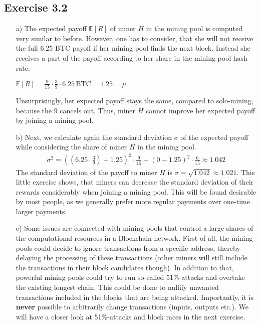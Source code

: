 \documentclass[12pt]{article}
\begin{document}
	\subsection*{Exercise 3.2}
	\begin{itemize}
		\item[a)] The expected payoff $\mathbb{E}[R]$ of miner $H$ in the mining pool is computed very similar to before. However, one has to consider, that she will not receive the full 6.25 BTC payoff if her mining pool finds the next block. Instead she receives a part of the payoff according to her share in the mining pool hash rate.
		\begin{center}
			$\mathbb{E}[R] = \frac{9}{15} \cdot \frac{3}{9} \cdot 6.25 \, \text{BTC} = 1.25 = \mu$
		\end{center}
		Unsurprisingly, her expected payoff stays the same, compared to solo-mining, because the $9$ cancels out. Thus, miner $H$ cannot improve her expected payoff by joining a mining pool. 
		\item[b)] Next, we calculate again the standard deviation $\sigma$ of the expected payoff while considering the share of miner $H$ in the mining pool.
		\begin{align*}
			\sigma^{2} = ((6.25 \cdot \frac{3}{9})-1.25)^{2} \cdot \frac{9}{15} + (0-1.25)^{2} \cdot \frac{6}{15} \approx  1.042
		\end{align*}
		The standard deviation of the payoff to miner $H$ is $\sigma = \sqrt{1.042} \approx 1.021$. This little exercise shows, that miners can decrease the standard deviation of their rewards considerably when joining a mining pool. This will be found desirable by most people, as we generally prefer more regular payments over one-time larger payments.
		\item[c)] Some issues are connected with mining pools that control a large shares of the computational resources in a Blockchain network. First of all, the mining pools could decide to ignore transactions from a specific address, thereby delaying the processing of these transactions (other miners will still include the transactions in their block candidates though). In addition to that, powerful mining pools could try to run so-called 51\%-attacks and overtake the existing longest chain. This could be done to nullify unwanted transactions included in the blocks that are being attacked. Importantly, it is \textbf{never} possible to arbitrarily change transactions (inputs, outputs etc.). We will have a closer look at 51\%-attacks and block races in the next exercise.
	\end{itemize}
	
\end{document}

